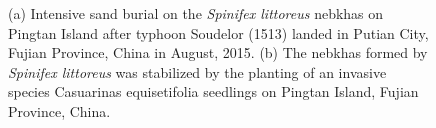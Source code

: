 \documentclass[]{interact}
\theoremstyle{plain}%
\theoremstyle{definition}
\theoremstyle{remark}
\begin{document}
\begin{figure}
  \centering
  \hspace{5pt}
  \caption{(a) Intensive sand burial on the \textit{Spinifex littoreus} nebkhas on Pingtan Island after typhoon Soudelor (1513) landed in Putian City, Fujian Province, China in August, 2015. (b) The nebkhas formed by \textit{Spinifex littoreus} was stabilized by the planting of an invasive species Casuarinas equisetifolia seedlings on Pingtan Island, Fujian Province, China.} 
  \label{fig:sample-pic}
\end{figure}
\end{document}
